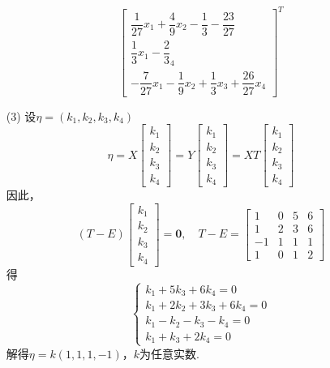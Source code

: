 \documentclass[12pt, a4paper, oneside, fontset=none]{ctexart}
\begin{document}
\begin{enumerate}
\[\begin{bmatrix}
                \dfrac{1}{27}x_1 + \dfrac{4}{9}x_2 - \dfrac{1}{3} - \dfrac{23}{27} \\
                \dfrac{1}{3}x_1 - \dfrac{2}{3}_4                                   \\
                -\dfrac{7}{27}x_1 - \dfrac{1}{9}x_2 + \dfrac{1}{3}x_3 + \dfrac{26}{27}x_4
            \end{bmatrix}^T
        \]
    \item[(3)] 设$\eta = (k_1, k_2, k_3, k_4)$
        \[
            \eta = X \begin{bmatrix}
                k_1 \\
                k_2 \\
                k_3 \\
                k_4
            \end{bmatrix} = Y \begin{bmatrix}
                k_1 \\
                k_2 \\
                k_3 \\
                k_4
            \end{bmatrix} = XT \begin{bmatrix}
                k_1 \\
                k_2 \\
                k_3 \\
                k_4
            \end{bmatrix}
        \]
        因此，
        \[
            (T - E) \begin{bmatrix}
                k_1 \\
                k_2 \\
                k_3 \\
                k_4
            \end{bmatrix} = \bm{0}, \quad T - E = \begin{bmatrix}
                1  & 0 & 5 & 6 \\
                1  & 2 & 3 & 6 \\
                -1 & 1 & 1 & 1 \\
                1  & 0 & 1 & 2
            \end{bmatrix}
        \]
        得
        \[
            \begin{cases}
                k_1 + 5k_3 + 6k_4 = 0        \\
                k_1 + 2k_2 + 3k_3 + 6k_4 = 0 \\
                k_1 - k_2 - k_3 - k_4 = 0    \\
                k_1 + k_3 + 2k_4 = 0
            \end{cases}
        \]
        解得$\eta = k(1,1,1,-1)$，$k$为任意实数.
\end{enumerate}
\end{document}
